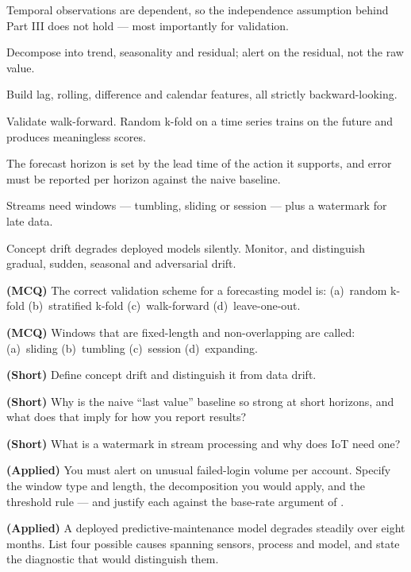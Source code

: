 \begin{chaptersummary}
\begin{tight}
  \item Temporal observations are dependent, so the independence assumption behind
        Part III does not hold --- most importantly for validation.
  \item Decompose into trend, seasonality and residual; alert on the residual, not
        the raw value.
  \item Build lag, rolling, difference and calendar features, all strictly
        backward-looking.
  \item Validate walk-forward. Random k-fold on a time series trains on the future
        and produces meaningless scores.
  \item The forecast horizon is set by the lead time of the action it supports, and
        error must be reported per horizon against the naive baseline.
  \item Streams need windows --- tumbling, sliding or session --- plus a watermark
        for late data.
  \item Concept drift degrades deployed models silently. Monitor, and distinguish
        gradual, sudden, seasonal and adversarial drift.
\end{tight}
\end{chaptersummary}

\begin{reviewq}
  \item \textbf{(MCQ)} The correct validation scheme for a forecasting model is:
        (a)~random k-fold (b)~stratified k-fold (c)~walk-forward (d)~leave-one-out.
  \item \textbf{(MCQ)} Windows that are fixed-length and non-overlapping are called:
        (a)~sliding (b)~tumbling (c)~session (d)~expanding.
  \item \textbf{(Short)} Define concept drift and distinguish it from data drift.
  \item \textbf{(Short)} Why is the naive ``last value'' baseline so strong at short
        horizons, and what does that imply for how you report results?
  \item \textbf{(Short)} What is a watermark in stream processing and why does IoT
        need one?
  \item \textbf{(Applied)} You must alert on unusual failed-login volume per account.
        Specify the window type and length, the decomposition you would apply, and the
        threshold rule --- and justify each against the base-rate argument of
        .
  \item \textbf{(Applied)} A deployed predictive-maintenance model degrades steadily
        over eight months. List four possible causes spanning sensors, process and
        model, and state the diagnostic that would distinguish them.
\end{reviewq}
